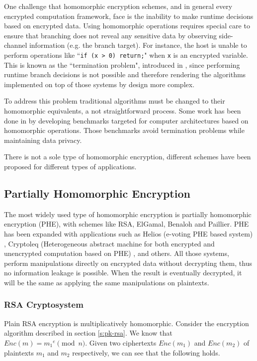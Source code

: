 One challenge that homomorphic encryption schemes, and in general every encrypted computation framework, face is the inability to make runtime decisions based on encrypted data.
Using homomorphic operations requires special care to ensure that branching does not reveal any sensitive data by observing side-channel information (e.g. the branch target).
For instance, the host is unable to perform operations like ``\texttt{if (x > 0) return;}" when \texttt{x} is an encrypted variable.
This is known as the ``termination problem", introduced in \cite{brenner2011secret}, since performing runtime branch decisions is not possible and therefore rendering the algorithms implemented on top of those systems by design more complex.


To address this problem traditional algorithms must be changed to their homomorphic equivalents, a not straightforward process.
Some work has been done in \cite{mouris2018terminator} by developing benchmarks targeted for computer architectures based on homomorphic operations.
Those benchmarks avoid termination problems while maintaining data privacy.


There is not a sole type of homomorphic encryption, different schemes have been proposed for different types of applications.


\subsection{Partially Homomorphic Encryption}\label{ss:phe}
The most widely used type of homomorphic encryption is partially homomorphic encryption (PHE), with schemes like RSA, ElGamal, Benaloh and Paillier.
PHE has been expanded with applications such as Helios (e-voting PHE based system) \cite{adida2008helios}, Cryptoleq (Heterogeneous abstract machine for both encrypted and unencrypted computation based on PHE) \cite{mazonka2016cryptoleq}, and others.
All those systems, perform manipulations directly on encrypted data without decrypting them, thus no information leakage is possible.
When the result is eventually decrypted, it will be the same as applying the same manipulations on plaintexts.

\subsubsection{RSA Cryptosystem}\label{ss:rsa}
Plain RSA encryption is multiplicatively homomorphic. Consider the encryption algorithm described in section \ref{s:pk-rsa}. We know that $Enc(m) = {m_1}^{e}\pmod{n}$. Given two ciphertexts $Enc(m_1)$ and $Enc(m_2)$ of plaintexts $m_1$ and $m_2$ respectively,  we can see that the following holds.

